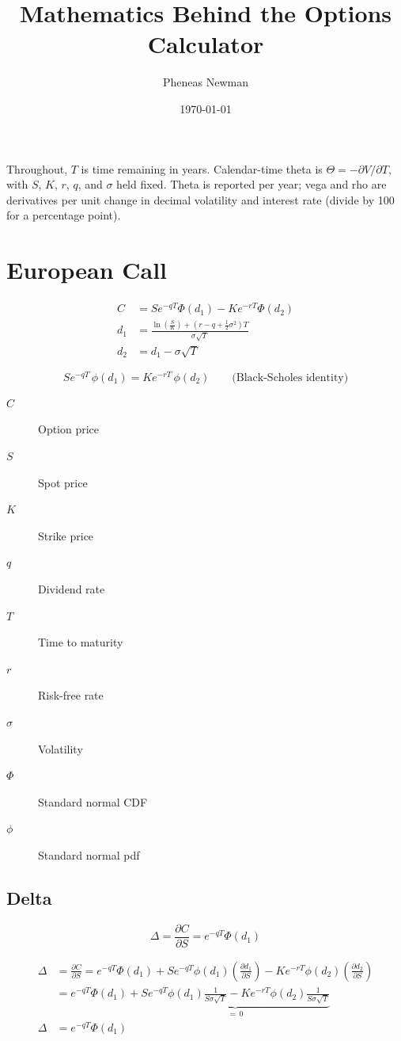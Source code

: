 \documentclass[12pt,a4paper]{article}
\begin{document}
\title{Mathematics Behind the Options Calculator}
\author{Pheneas Newman}
\date{\today}
\maketitle

Throughout, $T$ is time remaining in years. Calendar-time theta is
$\Theta=-\partial V/\partial T$, with $S$, $K$, $r$, $q$, and $\sigma$ held fixed.
Theta is reported per year; vega and rho are derivatives per unit change
in decimal volatility and interest rate (divide by 100 for a percentage point).

\section{European Call}

\[
  \begin{aligned}
    C   & = S e^{-qT} \Phi(d_1) - K e^{-rT} \Phi(d_2) \\ 
    d_1 & = \frac{\ln\!\left(\tfrac{S}{K}\right) + (r - q + \tfrac{1}{2}\sigma^2)T}{\sigma \sqrt{T}} \\
    d_2 & = d_1 - \sigma \sqrt{T}
  \end{aligned}
\]

\[
  \boxed{S e^{-qT}\,\phi(d_1) = K e^{-rT}\,\phi(d_2)}
  \qquad\text{(Black-Scholes identity)}
\]

\begin{description}
  \item[$C$] Option price
  \item[$S$] Spot price
  \item[$K$] Strike price
  \item[$q$] Dividend rate
  \item[$T$] Time to maturity
  \item[$r$] Risk-free rate
  \item[$\sigma$] Volatility
  \item[$\Phi$] Standard normal CDF
  \item[$\phi$] Standard normal pdf
\end{description}

\subsection{Delta}
\[
  \boxed{\Delta = \frac{\partial C}{\partial S} = e^{-qT}\Phi(d_1)}
\]

\[
  \begin{aligned}
    \Delta & = \frac{\partial C}{\partial S} = e^{-qT}\Phi(d_1) + Se^{-q T}\phi(d_1)\left(\frac{\partial d_1}{\partial S}\right) - Ke^{-rT}\phi(d_2)\left(\frac{\partial d_2}{\partial S} \right) \\
           & = e^{-qT}\Phi(d_1) + \underbrace{Se^{-qT}\phi(d_1)\frac{1}{S \sigma \sqrt{T}} - Ke^{-rT}\phi(d_2)\frac{1}{S \sigma \sqrt{T}}}_{=\,0} \\
    \Delta & = e^{-qT}\Phi(d_1)
  \end{aligned}
\]
\end{document}
